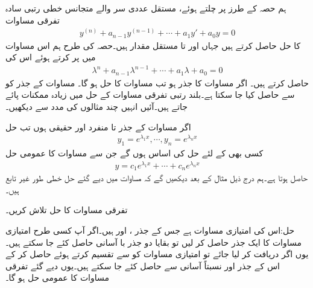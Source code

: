 ہم حصہ  کے طرز پر چلتے ہوئے، مستقل عددی سر والے متجانس خطی  رتبی  سادہ تفرقی مساوات
\begin{align}\label{مساوات_سادہ_بلند_مستقل_سر_متجانس_الف}
y^{(n)}+a_{n-1}y^{(n-1)}+\cdots+a_1y'+a_0y=0
\end{align}
کا حل حاصل کرتے ہیں جہاں  اور  تا  مستقل مقدار ہیں۔حصہ  کی طرح ہم اس مساوات میں  پر کرتے ہوئے اس کی  
\begin{align}\label{مساوات_سادہ_بلند_مستقل_سر_متجانس_ب}
\lambda^n+a_{n-1}\lambda^{n-1}+\cdots+a_1 \lambda+a_0=0
\end{align}
حاصل کرتے ہیں۔ اگر  مساوات  کا جذر ہو تب  مساوات  کا حل ہو گا۔ مساوات  کے جذر کو  سے حاصل کیا جا سکتا ہے۔بلند رتبی  تفرقی مساوات کے حل میں زیادہ ممکنات پائے جاتے ہیں۔آئیں انہیں چند مثالوں کی مدد سے دیکھیں۔

اگر مساوات  کے  جذر  تا  منفرد اور حقیقی ہوں  تب حل
\begin{align}\label{مساوات_سادہ_بلند_مستقل_سر_متجانس_پ}
y_1=e^{\lambda_1 x}, \cdots , y_n=e^{\lambda_n x}
\end{align}
کسی بھی  کے لئے حل کی اساس ہوں گے جن سے مساوات  کا عمومی حل
\begin{align}\label{مساوات_سادہ_بلند_مستقل_سر_متجانس_ت}
y=c_1 e^{\lambda_1 x}+\cdots+c_n e^{\lambda_n x}
\end{align}
حاصل ہوتا ہے۔ہم درج ذیل مثال کے بعد دیکھیں گے کہ مساوات  میں دیے گئے حل خطی طور غیر تابع ہیں۔

تفرقی مساوات  کا حل تلاش کریں۔

حل:اس کی امتیازی مساوات  ہے جس کے جذر ،  اور  ہیں۔اگر آپ کسی طرح امتیازی مساوات کا ایک جذر حاصل کر لیں تو بقایا دو جذر با آسانی حاصل کئے جا سکتے ہیں۔یوں اگر  دریافت کر لیا جائے تو امتیازی مساوات کو  سے تقسیم کرتے ہوئے   حاصل کر کے اس کے جذر  اور  نسبتاً آسانی سے حاصل کئے جا سکتے ہیں۔یوں دیے گئے تفرقی مساوات کا  عمومی حل  ہو گا۔

